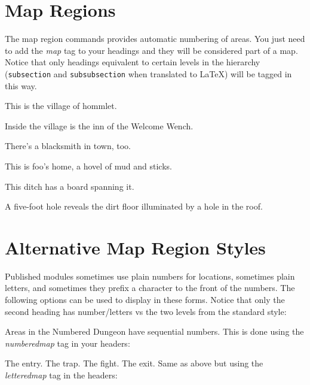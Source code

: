 \documentclass[10pt,twoside,twocolumn,openany,bg=full,notitlepage,nodeprecatedcode]{dndbook}
\begin{document}
\section{Map Regions}
\label{sec:orga32af69}

The map region commands provides automatic numbering of areas. You just need to add the \emph{map} tag to your headings and they will be considered part of a map. Notice that only headings equivalent to certain levels in the hierarchy (\texttt{subsection} and \texttt{subsubsection} when translated to \LaTeX) will be tagged in this way.

\label{sec:org4f1a55d}

This is the village of hommlet.

\label{sec:org4e01daa}

Inside the village is the inn of the Welcome Wench.

\label{sec:org111cbb2}

There's a blacksmith in town, too.

\label{sec:org3ef71aa}

This is foo's home, a hovel of mud and sticks.

\label{sec:org3923bcd}

This ditch has a board spanning it.

\label{sec:orgdcbea78}

A five-foot hole reveals the dirt floor illuminated by a hole in the roof.

\section{Alternative Map Region Styles}
\label{sec:org66eabc0}
    Published modules sometimes use plain numbers for locations, sometimes plain letters, and sometimes they prefix a
character to the front of the numbers. The following options can be used to display in these forms. Notice that only the
second heading has number/letters vs the two levels from the standard style:

\label{sec:orgbf339af}
Areas in the Numbered Dungeon have sequential numbers. This is done using
the \emph{numberedmap} tag in your headers:

\label{sec:org47c910b}
The entry.
\label{sec:orgedd280f}
The trap.
\label{sec:org9ba81db}
The fight.
\label{sec:orgddd484a}
The exit.
\label{sec:orga700f1c}
Same as above but using the \emph{letteredmap} tag in the headers:
\end{document}
